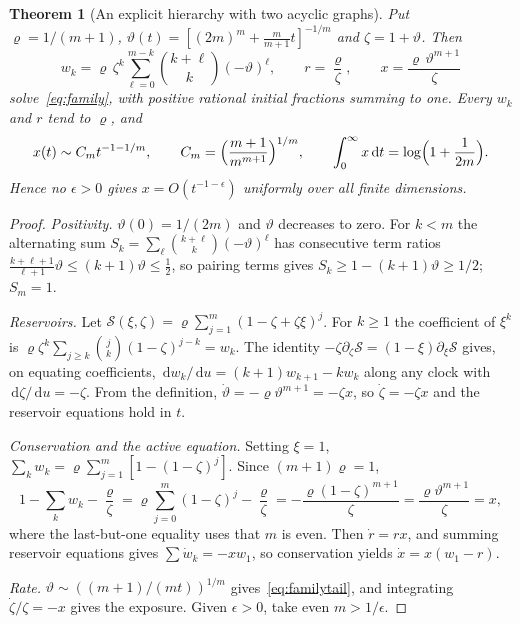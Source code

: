 \documentclass[11pt,a4paper]{article}
\newtheorem{theorem}{Theorem}[section]
\theoremstyle{definition}\newtheorem{definition}[theorem]{Definition}
\theoremstyle{remark}\newtheorem{remark}[theorem]{Remark}
\newcommand{\dd}{\,\mathrm d}
\begin{document}
\begin{theorem}[An explicit hierarchy with two acyclic graphs]
\label{thm:hierarchy}
Put $\varrho=1/(m+1)$, $\vartheta(t)=[(2m)^m+\tfrac m{m+1}t]^{-1/m}$ and
$\zeta=1+\vartheta$. Then
\begin{equation}
w_k=\varrho\,\zeta^k\sum_{\ell=0}^{m-k}\binom{k+\ell}{k}(-\vartheta)^\ell,\qquad
r=\frac\varrho\zeta,\qquad x=\frac{\varrho\,\vartheta^{m+1}}\zeta
\label{eq:familytrajectory}
\end{equation}
solve~\eqref{eq:family}, with positive rational initial fractions summing
to one. Every $w_k$ and $r$ tend to $\varrho$, and
\begin{equation}
x(t)\sim C_mt^{-1-1/m},\qquad C_m=\Bigl(\frac{m+1}{m^{m+1}}\Bigr)^{1/m},\qquad
\int_0^\infty x\dd t=\log\Bigl(1+\frac1{2m}\Bigr).
\label{eq:familytail}
\end{equation}
Hence no $\epsilon>0$ gives $x=O(t^{-1-\epsilon})$ uniformly over all
finite dimensions.
\end{theorem}
\begin{proof}
\emph{Positivity.} $\vartheta(0)=1/(2m)$ and $\vartheta$ decreases to
zero. For $k<m$ the alternating sum
$S_k=\sum_\ell\binom{k+\ell}k(-\vartheta)^\ell$ has consecutive term
ratios $\frac{k+\ell+1}{\ell+1}\vartheta\le(k+1)\vartheta\le\frac12$, so
pairing terms gives $S_k\ge1-(k+1)\vartheta\ge1/2$; $S_m=1$.

\emph{Reservoirs.} Let
$\mathcal S(\xi,\zeta)=\varrho\sum_{j=1}^m(1-\zeta+\zeta\xi)^j$. For
$k\ge1$ the coefficient of $\xi^k$ is
$\varrho\zeta^k\sum_{j\ge k}\binom jk(1-\zeta)^{j-k}=w_k$. The identity
$-\zeta\partial_\zeta\mathcal S=(1-\xi)\partial_\xi\mathcal S$ gives, on
equating coefficients, $\dd w_k/\dd u=(k+1)w_{k+1}-kw_k$ along any clock
with $\dd\zeta/\dd u=-\zeta$. From the definition,
$\dot\vartheta=-\varrho\vartheta^{m+1}=-\zeta x$, so $\dot\zeta=-\zeta x$
and the reservoir equations hold in $t$.

\emph{Conservation and the active equation.} Setting $\xi=1$,
$\sum_kw_k=\varrho\sum_{j=1}^m[1-(1-\zeta)^j]$. Since $(m+1)\varrho=1$,
\[
1-\sum_kw_k-\frac\varrho\zeta=\varrho\sum_{j=0}^m(1-\zeta)^j-\frac\varrho\zeta
=-\frac{\varrho(1-\zeta)^{m+1}}\zeta=\frac{\varrho\vartheta^{m+1}}\zeta=x,
\]
where the last-but-one equality uses that $m$ is even. Then
$\dot r=rx$, and summing reservoir equations gives
$\sum\dot w_k=-xw_1$, so conservation yields $\dot x=x(w_1-r)$.

\emph{Rate.} $\vartheta\sim((m+1)/(mt))^{1/m}$ gives~\eqref{eq:familytail},
and integrating $\dot\zeta/\zeta=-x$ gives the exposure. Given
$\epsilon>0$, take even $m>1/\epsilon$.
\end{proof}
\end{document}
